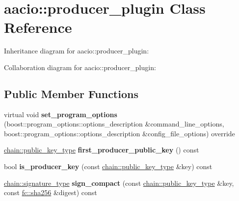 \hypertarget{classaacio_1_1producer__plugin}{}\section{aacio\+:\+:producer\+\_\+plugin Class Reference}
\label{classaacio_1_1producer__plugin}


Inheritance diagram for aacio\+:\+:producer\+\_\+plugin\+:


Collaboration diagram for aacio\+:\+:producer\+\_\+plugin\+:
\subsection*{Public Member Functions}
\begin{DoxyCompactItemize}
\item 
\mbox{\label{classaacio_1_1producer__plugin_a3074c4cf916b193d6c67d341e0ce5d17}} 
virtual void {\bfseries set\+\_\+program\+\_\+options} (boost\+::program\+\_\+options\+::options\+\_\+description \&command\+\_\+line\+\_\+options, boost\+::program\+\_\+options\+::options\+\_\+description \&config\+\_\+file\+\_\+options) override
\item 
\mbox{\label{classaacio_1_1producer__plugin_a0daa688b1f496c2436544ba6582f3d10}} 
\mbox{\hyperlink{classfc_1_1crypto_1_1public__key}{chain\+::public\+\_\+key\+\_\+type}} {\bfseries first\+\_\+producer\+\_\+public\+\_\+key} () const
\item 
\mbox{\label{classaacio_1_1producer__plugin_a13aef2dbdb6a2530271c57e4ed1dcc58}} 
bool {\bfseries is\+\_\+producer\+\_\+key} (const \mbox{\hyperlink{classfc_1_1crypto_1_1public__key}{chain\+::public\+\_\+key\+\_\+type}} \&key) const
\item 
\mbox{\label{classaacio_1_1producer__plugin_a4624da5d453fd4fbba550d1eada38d3d}} 
\mbox{\hyperlink{classfc_1_1crypto_1_1signature}{chain\+::signature\+\_\+type}} {\bfseries sign\+\_\+compact} (const \mbox{\hyperlink{classfc_1_1crypto_1_1public__key}{chain\+::public\+\_\+key\+\_\+type}} \&key, const \mbox{\hyperlink{classfc_1_1sha256}{fc\+::sha256}} \&digest) const
\item 
\mbox{\label{classaacio_1_1producer__plugin_a54ab2ab00152d661bd167e3d0085fa75}} 

\end{DoxyCompactItemize}
